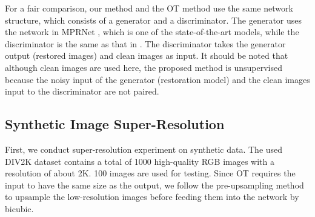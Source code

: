 \documentclass[10pt,journal,compsoc]{IEEEtran}
\begin{document}
For a fair comparison, our method and the OT method \cite{wang2022optimal}
use the same network structure, which consists of a generator and a discriminator. 
The generator uses the network in MPRNet \cite{multi}, which is one of the state-of-the-art models, 
while the discriminator is the same as that in \cite{wang2022optimal}. 
The discriminator takes the generator output (restored images) and clean images as input. 
It should be noted that although clean images are used here, 
the proposed method is unsupervised because the noisy input of 
the generator (restoration model) and the clean images 
input to the discriminator are not paired.

\subsection{Synthetic Image Super-Resolution}

First, we conduct super-resolution experiment 
on synthetic data. The used DIV2K\cite{div2k} 
dataset contains a total of 1000 high-quality RGB 
images with a resolution of about 2K. 100 images are 
used for testing. Since OT requires the input to have 
the same size as the output, we follow the pre-upsampling 
method \cite{wang2020deep} to upsample the low-resolution 
images before feeding them into the network by bicubic.
\end{document}
